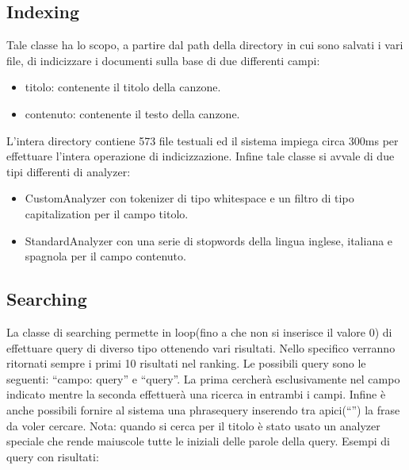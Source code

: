 \documentclass[12pt, letterpaper]{article}
\begin{document}
\subsection{Indexing}
Tale classe ha lo scopo, a partire dal path della directory in cui sono salvati i vari file, di indicizzare i documenti sulla base di due differenti campi: 
\begin{itemize}
    \item titolo: contenente il titolo della canzone.
    \item contenuto: contenente il testo della canzone.
\end{itemize}
L'intera directory contiene 573 file testuali ed il sistema impiega circa 300ms per effettuare l'intera operazione di indicizzazione. Infine tale classe si avvale di due tipi differenti di analyzer:
\begin{itemize}
    \item CustomAnalyzer con tokenizer di tipo whitespace e un filtro di tipo capitalization per il campo titolo.
    \item StandardAnalyzer con una serie di stopwords della lingua inglese, italiana e spagnola per il campo contenuto.
\end{itemize}
\subsection{Searching}
La classe di searching permette in loop(fino a che non si inserisce il valore 0) di effettuare query di diverso tipo ottenendo vari risultati. Nello specifico verranno ritornati sempre i primi 10 risultati nel ranking. Le possibili query sono le seguenti: “campo: query” e “query”. La prima cercherà esclusivamente nel campo indicato mentre la seconda effettuerà una ricerca in entrambi i campi. Infine è anche possibili fornire al sistema una phrasequery inserendo tra apici(“”) la frase da voler cercare. Nota: quando si cerca per il titolo è stato usato un analyzer speciale che rende maiuscole tutte le iniziali delle parole della query.
Esempi di query con risultati:
\end{document}
